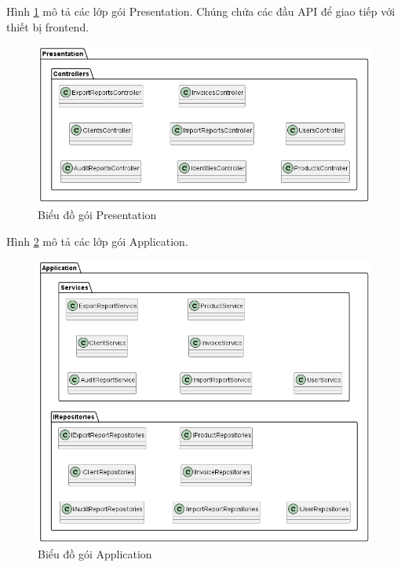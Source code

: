 \documentclass[../DoAn.tex]{subfiles}
\begin{document}
Hình \ref{fig:systemdesign-package-server-presentation} mô tả các lớp gói Presentation. Chúng chứa các đầu API để giao tiếp với thiết bị frontend.
\begin{figure}[H]
    \centering
    \includegraphics[width=1\textwidth]{Hinhve/design/package/server/Presentation}
    \caption{Biểu đồ gói Presentation}
    \label{fig:systemdesign-package-server-presentation}
\end{figure}
\break

Hình \ref{fig:systemdesign-package-server-application} mô tả các lớp gói Application.
\begin{figure}[H]
    \centering
    \includegraphics[width=1\textwidth]{Hinhve/design/package/server/Application}
    \caption{Biểu đồ gói Application}
    \label{fig:systemdesign-package-server-application}
\end{figure}
\end{document}

